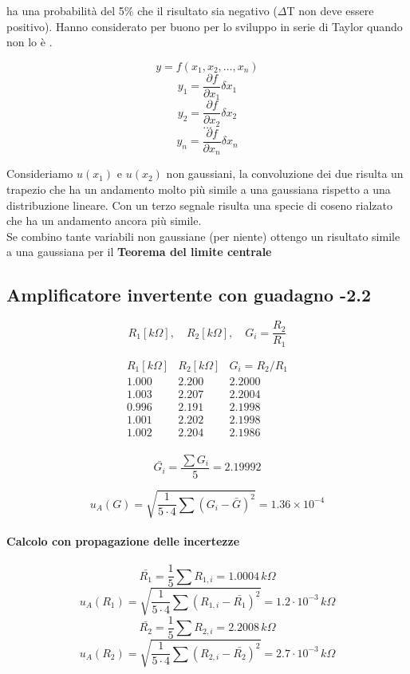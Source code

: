 ha una probabilità del 5\% che il risultato sia negativo ($\Delta$T non deve essere positivo). Hanno considerato per buono per lo sviluppo in serie di Taylor quando non lo è . 

\[
y = f(x_1, x_2, \ldots, x_n)
\]
\[
y_1 = \frac{\partial f}{\partial x_1} \delta x_1
\]
\[
y_2 = \frac{\partial f}{\partial x_2} \delta x_2
\]
\[
\ldots
\]
\[
y_n = \frac{\partial f}{\partial x_n} \delta x_n
\]

Consideriamo $u(x_1)$ e $u(x_2)$ non gaussiani, la convoluzione dei due risulta un trapezio che ha un andamento molto più simile a una gaussiana rispetto a una distribuzione lineare. Con un terzo segnale risulta una specie di coseno rialzato che ha un andamento ancora più simile.\\
Se combino tante variabili non gaussiane (per niente) ottengo un risultato simile a una gaussiana per il \textbf{Teorema del limite centrale}





\subsection{Amplificatore invertente con guadagno -2.2}
\[
R_1 [k\Omega], \quad R_2 [k\Omega], \quad G_i = \frac{R_2}{R_1}
\]

\[
\begin{array}{ccc}
R_1 [k\Omega] & R_2 [k\Omega] & G_i = R_2/R_1 \\ \hline
1.000 & 2.200 & 2.2000 \\
1.003 & 2.207 & 2.2004 \\
0.996 & 2.191 & 2.1998 \\
1.001 & 2.202 & 2.1998 \\
1.002 & 2.204 & 2.1986 \\
\end{array}
\]

\[
\bar{G_i} = \frac{\sum G_i}{5} = 2.19992
\]

\[
u_A(G) =  \sqrt{\frac{1}{5\cdot4}\sum (G_i - \bar{G})^2} = 1.36 \times 10^{-4}
\]

\paragraph{Calcolo con propagazione delle incertezze}

\[
\bar{R_1} = \frac{1}{5}\sum R_{1,i} = 1.0004\,k\Omega
\]
\[
u_A(R_1) =  \sqrt{ \frac{1}{5\cdot4} \sum (R_{1,i} - \bar{R_1})^2} = 1.2\cdot10^{-3}\,k\Omega
\]
\[
\bar{R_2} = \frac{1}{5}\sum R_{2,i} = 2.2008\,k\Omega
\]
\[
u_A(R_2) = \sqrt{ \frac{1}{5\cdot4} \sum (R_{2,i} - \bar{R_2})^2} = 2.7\cdot10^{-3}\,k\Omega
\]

